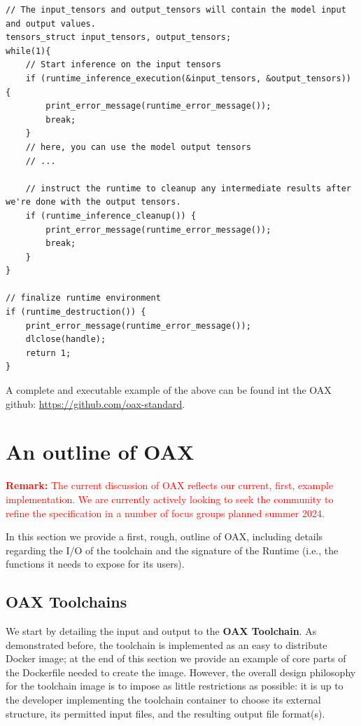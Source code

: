 \documentclass{article}
\newcommand{\remark}[1]{\textcolor{red}{\textbf{\newline Remark:} \newline #1 \newline}}
\newcommand{\oaxgit}{\href{https://github.com/oax-standard}{https://github.com/oax-standard}}
\begin{document}
\begin{lstlisting}
// The input_tensors and output_tensors will contain the model input and output values.
tensors_struct input_tensors, output_tensors;
while(1){
    // Start inference on the input tensors
    if (runtime_inference_execution(&input_tensors, &output_tensors)) {
        print_error_message(runtime_error_message());
        break;
    }
    // here, you can use the model output tensors
    // ...

    // instruct the runtime to cleanup any intermediate results after we're done with the output tensors.
    if (runtime_inference_cleanup()) {
        print_error_message(runtime_error_message());
        break;
    }
}

// finalize runtime environment
if (runtime_destruction()) {
    print_error_message(runtime_error_message());
    dlclose(handle);
    return 1;
}
\end{lstlisting}

A complete and executable example of the above can be found int the OAX github: \oaxgit.

\newpage
\section{An outline of OAX}
\label{sec:oax-outline}

\remark{The current discussion of OAX reflects our current, first, example implementation. We are currently actively looking to seek the community to refine the specification in a number of focus groups planned summer 2024.}

In this section we provide a first, rough, outline of OAX, including details regarding the I/O of the toolchain and the signature of the Runtime (i.e., the functions it needs to expose for its users).

\subsection{OAX Toolchains}

We start by detailing the input and output to the \textbf{OAX Toolchain}. As demonstrated before, the toolchain is implemented as an easy to distribute Docker image; at the end of this section we provide an example of core parts of the Dockerfile needed to create the image. However, the overall design philosophy for the toolchain image is to impose as little restrictions as possible: it is up to the developer implementing the toolchain container to choose its external structure, its permitted input files, and the resulting output file format(s).
\end{document}
